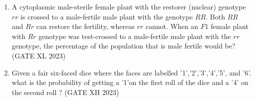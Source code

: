 \begin{enumerate}[label=\thechapter.\arabic*,ref=\thechapter.\theenumi]
\item A cytoplasmic male-sterile female plant with the restorer (nuclear) genotype $rr$ is crossed to a male-fertile male plant with the genotype $RR$. Both $RR$ and $Rr$ can restore the fertility, whereas $rr$ cannot. When an $F1$ female plant with $Rr$ genotype was test-crossed to a male-fertile male plant with the $rr$ genotype, the percentage of the population that is male fertile would be?
\hfill (GATE XL 2023)\\

\item Given a fair six-faced dice where the faces are labelled '1','2','3','4','5', and '6'. what is the probability of getting a '1'on the first roll of the dice and a '4' on the second roll ?
\hfill (GATE XH 2023)\\

\end{enumerate}
